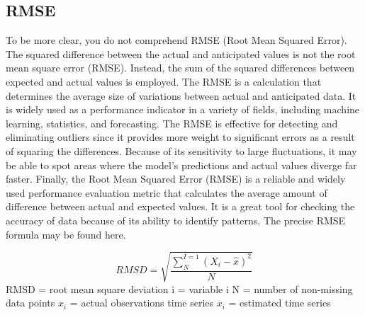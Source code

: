 \documentclass[a4paper,fleqn]{cas-sc}
\begin{document}
  \subsection{ RMSE}
  To be more clear, you do not comprehend RMSE (Root Mean Squared Error). The squared difference between the actual and anticipated values is not the root mean square error (RMSE). Instead, the sum of the squared differences between expected and actual values is employed. The RMSE is a calculation that determines the average size of variations between actual and anticipated data. It is widely used as a performance indicator in a variety of fields, including machine learning, statistics, and forecasting. The RMSE is effective for detecting and eliminating outliers since it provides more weight to significant errors as a result of squaring the differences. 
  Because of its sensitivity to large fluctuations, it may be able to spot areas where the model's predictions and actual values diverge far faster. Finally, the Root Mean Squared Error (RMSE) is a reliable and widely used performance evaluation metric that calculates the average amount of difference between actual and expected values. It is a great tool for checking the accuracy of data because of its ability to identify patterns. The precise RMSE formula may be found here.\cite{abuella2015solar}
  
  \begin{equation}
  RMSD = \sqrt{\frac{\sum_{N}^{I=1}(X_i-\hat{x})^{2}}{N}}
  \end{equation}
  RMSD = root mean square deviation 
  i = variable i 
  N = number of non-missing data points
  ${x_i}$ = actual observations time series 
  ${x_i}$ = estimated time series 
   
\end{document}
